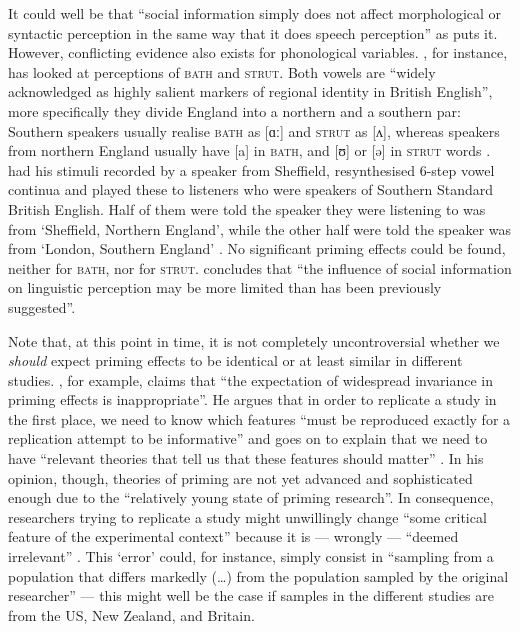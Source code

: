 It could well be that ``social information simply does not affect morphological or syntactic perception in the same way that it does speech perception'' as \textcite[229]{squires2013} puts it.
However, conflicting evidence also exists for phonological variables.
\textcite{lawrence2015}, for instance, has looked at perceptions of \textsc{bath} and \textsc{strut}.
Both vowels are ``widely acknowledged as highly salient markers of regional identity in British English'', more specifically they divide England into a northern and a southern par: Southern speakers usually realise \textsc{bath} as [ɑː] and \textsc{strut} as [ʌ], whereas speakers from northern England usually have [a] in \textsc{bath}, and [ʊ] or [ə] in \textsc{strut} words \parencite[cf.][1]{lawrence2015}.
\citeauthor{lawrence2015} had his stimuli recorded by a speaker from Sheffield, resynthesised 6-step vowel continua and played these to listeners who were speakers of Southern Standard British English.
Half of them were told the speaker they were listening to was from `Sheffield, Northern England', while the other half were told the speaker was from `London, Southern England' \parencite[cf.][2--3]{lawrence2015}.
No significant priming effects could be found, neither for \textsc{bath}, nor for \textsc{strut}.
\textcite[cf.][4]{lawrence2015} concludes that ``the influence of social information on linguistic perception may be more limited than has been previously suggested''.

Note that, at this point in time, it is not completely uncontroversial whether we \emph{should} expect priming effects to be identical or at least similar in different studies.
\textcite[45]{cesario2014}, for example, claims that ``the expectation of widespread invariance in priming effects is inappropriate''.
He argues that in order to replicate a study in the first place, we need to know which features ``must be reproduced exactly for a replication attempt to be informative'' and goes on to explain that we need to have ``relevant theories that tell us that these features should matter'' \parencite[42]{cesario2014}.
In his opinion, though, theories of priming are not yet advanced and sophisticated enough due to the ``relatively young state of priming research''.
In consequence, researchers trying to replicate a study might unwillingly change ``some critical feature of the experimental context'' because it is --- wrongly --- ``deemed irrelevant'' \parencite[43]{cesario2014}.
This `error' could, for instance, simply consist in ``sampling from a population that differs markedly (\ldots) from the population sampled by the original researcher'' \parencite[43]{cesario2014} --- this might well be the case if samples in the different studies are from the US, New Zealand, and Britain.

